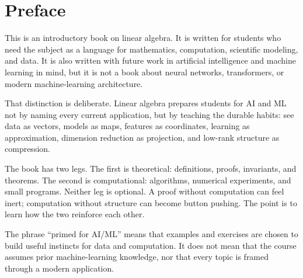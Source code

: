\chapter*{Preface}

This is an introductory book on linear algebra. It is written for students who
need the subject as a language for mathematics, computation, scientific
modeling, and data. It is also written with future work in artificial
intelligence and machine learning in mind, but it is not a book about neural
networks, transformers, or modern machine-learning architecture.

That distinction is deliberate. Linear algebra prepares students for AI and ML
not by naming every current application, but by teaching the durable habits:
see data as vectors, models as maps, features as coordinates, learning as
approximation, dimension reduction as projection, and low-rank structure as
compression.

The book has two legs. The first is theoretical: definitions, proofs,
invariants, and theorems. The second is computational: algorithms, numerical
experiments, and small programs. Neither leg is optional. A proof without
computation can feel inert; computation without structure can become button
pushing. The point is to learn how the two reinforce each other.

\begin{warningbox}
The phrase ``primed for AI/ML'' means that examples and exercises are chosen to
build useful instincts for data and computation. It does not mean that the
course assumes prior machine-learning knowledge, nor that every topic is
framed through a modern application.
\end{warningbox}
